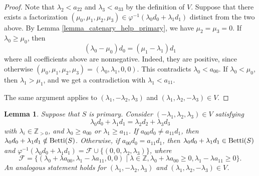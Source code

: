 \documentclass[12pt]{article}
\newtheorem{lemma}[thm]{Lemma}
\theoremstyle{remark}
\begin{document}
\begin{proof}
Note that $\lambda_2< a_{22}$ and $\lambda_3 < a_{33}$ by the definition of $V$.
Suppose that there exists a factorization $ (\mu_0,\mu_1,\mu_2,\mu_3) \in \varphi^{-1}(\lambda_0d_0 + \lambda_1d_1)$ distinct from the two above. 
By Lemma \ref{lemma_catenary_help_primary}, we have $\mu_2 = \mu_3 = 0 $. 
If $\lambda_0 \geq \mu_0$, then
\begin{equation}
    (\lambda_0- \mu_0) d_0 =  (\mu_1 - \lambda_1)d_1
\end{equation}
where all coefficients above are nonnegative. Indeed, they are positive, since otherwise $(\mu_0,\mu_1,\mu_2,\mu_3) = (\lambda_0,\lambda_1,0,0)$. This contradicts $\lambda_0 < a_{00}$. If $\lambda_0 < \mu_0$, then $\lambda_1 > \mu_1$, and we get a contradiction with $\lambda_1 < a_{11}$. 

The same argument applies to $(\lambda_1,-\lambda_2,\lambda_3)$ and $(\lambda_1,\lambda_2,-\lambda_3) \in V$.
\end{proof}


\begin{lemma}\label{lemma_catenarycase1_primary}
    Suppose that $S$ is primary. Consider $(-\lambda_1,\lambda_2,\lambda_3) \in V$ satisfying
    $$ \lambda_0d_0 + \lambda_1d_1 = \lambda_2d_2 + \lambda_3d_3$$
    with $\lambda_i \in \mathbb{Z}_{>0}$, and $ \lambda_0 \geq a_{00}$ or $ \lambda_1 \geq a_{11}$. If $a_{00}d_0 \neq a_{11}d_1$, then $\lambda_0d_0 + \lambda_1d_1 \notin \textup{Betti}(S)$. Otherwise, if $a_{00}d_0 = a_{11}d_1$, then $\lambda_0d_0 + \lambda_1d_1 \in \textup{Betti}(S)$ and $\varphi^{-1}(\lambda_0d_0 + \lambda_1d_1) = \mathcal{F} \cup \{(0,0,\lambda_2,\lambda_3)\}$, where 
    $$\mathcal{F} =   \{(\lambda_0 + \lambda a_{00},\lambda_1 - \lambda a_{11},0,0) \mid \lambda \in \mathbb{Z}, \lambda_0 + \lambda a_{00} \geq 0, \lambda_1 - \lambda a_{11} \geq 0 \}. $$ 
    An analogous statement holds for $(\lambda_1,-\lambda_2,\lambda_3)$ and $(\lambda_1,\lambda_2,-\lambda_3) \in V$.
\end{lemma}
\end{document}
